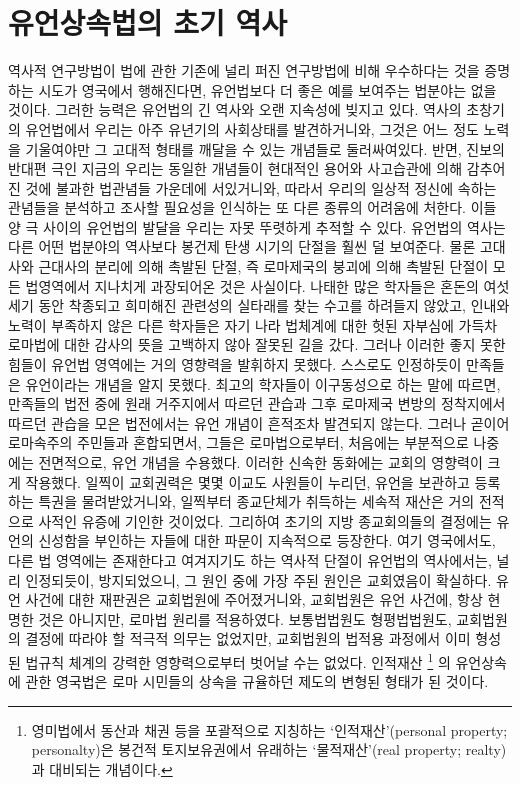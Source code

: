 \chapter{유언상속법의 초기 역사}

역사적 연구방법이
법에 관한
기존에 널리 퍼진 연구방법에 비해 우수하다는 것을
증명하는 시도가
영국에서
행해진다면,
유언법보다 더 좋은 예를 보여주는 법분야는 없을 것이다.
그러한 능력은 유언법의 긴 역사와 오랜 지속성에 빚지고 있다.
역사의 초창기의 유언법에서
우리는
아주 유년기의 사회상태를 발견하거니와,
그것은 어느 정도 노력을 기울여야만
그 고대적 형태를 깨달을 수 있는 개념들로 둘러싸여있다.
반면, 진보의 반대편 극인 지금의 우리는
동일한 개념들이
현대적인 용어와 사고습관에 의해 감추어진 것에
불과한
법관념들 가운데에 서있거니와,
따라서
우리의 일상적 정신에 속하는 관념들을 분석하고 조사할 필요성을
인식하는 또 다른 종류의 어려움에 처한다.
이들 양 극 사이의 유언법의 발달을
우리는
자못 뚜렷하게 추적할 수 있다.
유언법의 역사는
다른 어떤 법분야의 역사보다
봉건제 탄생 시기의 단절을 훨씬 덜 보여준다.
물론
고대사와 근대사의 분리에 의해 촉발된 단절,
즉 로마제국의 붕괴에 의해 촉발된 단절이
모든 법영역에서
지나치게 과장되어온 것은 사실이다.
나태한
많은 학자들은
혼돈의 여섯 세기 동안 착종되고 희미해진 관련성의 실타래를
찾는 수고를 하려들지 않았고,
인내와 노력이 부족하지 않은 다른 학자들은
자기 나라 법체계에 대한 헛된 자부심에 가득차
로마법에 대한 감사의 뜻을 고백하지 않아 잘못된 길을 갔다.
그러나 이러한 좋지 못한 힘들이 유언법 영역에는 거의 영향력을 발휘하지 못했다.
스스로도 인정하듯이 만족들은 유언이라는 개념을 알지 못했다.
최고의 학자들이 이구동성으로 하는 말에 따르면,
만족들의 법전 중에
원래 거주지에서 따르던 관습과 그후
로마제국 변방의 정착지에서 따르던 관습을 모은 법전에서는
유언 개념이 흔적조차 발견되지 않는다.
그러나 곧이어 로마속주의 주민들과 혼합되면서, 그들은
로마법으로부터, 처음에는 부분적으로 나중에는 전면적으로,
유언 개념을 수용했다.
이러한 신속한 동화에는 교회의 영향력이 크게 작용했다.
일찍이 교회권력은 몇몇 이교도 사원들이 누리던,
유언을 보관하고 등록하는 특권을 물려받았거니와,
일찍부터 종교단체가 취득하는 세속적 재산은
거의 전적으로 사적인 유증에 기인한 것이었다.
그리하여 초기의 지방 종교회의들의 결정에는
유언의 신성함을 부인하는 자들에 대한 파문이 지속적으로 등장한다.
여기 영국에서도,
다른 법 영역에는 존재한다고 여겨지기도 하는
역사적 단절이
유언법의 역사에서는, 널리 인정되듯이, 방지되었으니, 그 원인 중에
가장 주된 원인은 교회였음이 확실하다.
유언 사건에 대한 재판권은 교회법원에 주어졌거니와,
교회법원은 유언 사건에, 항상 현명한 것은 아니지만, 로마법 원리를 적용하였다.
보통법법원도 형평법법원도,
교회법원의 결정에 따라야 할 적극적 의무는 없었지만,
교회법원의 법적용 과정에서 이미 형성된 법규칙 체계의 강력한 영향력으로부터
벗어날 수는 없었다.
인적재산%
\footnote{영미법에서 동산과 채권 등을 포괄적으로 지칭하는
`인적재산'(personal property; personalty)은
봉건적 토지보유권에서 유래하는 `물적재산'(real property; realty)과
대비되는 개념이다.}%
의 유언상속에 관한 영국법은
로마 시민들의 상속을 규율하던 제도의 변형된 형태가 된 것이다.

